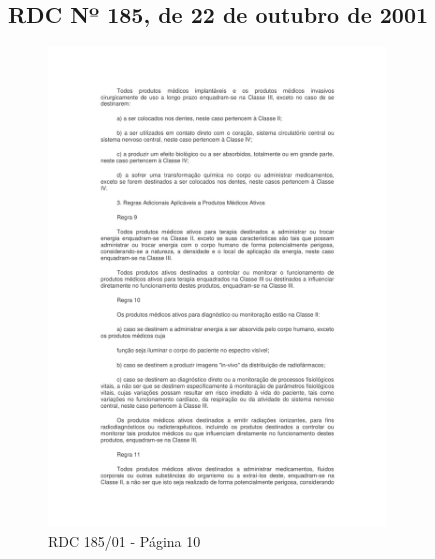 \begin{anexosenv}
 \partanexos

\chapter{RDC  Nº 185, de 22 de outubro de 2001}
\label{ane:RDC}

\begin{figure}[H]
    \centering
    \includegraphics[width=0.8\textwidth]{figuras/gerenciamento/RDC_1.pdf}
    \caption{RDC 185/01 - Página 10}
\label{fig:RDC_1}
\end{figure}


\end{anexosenv}
